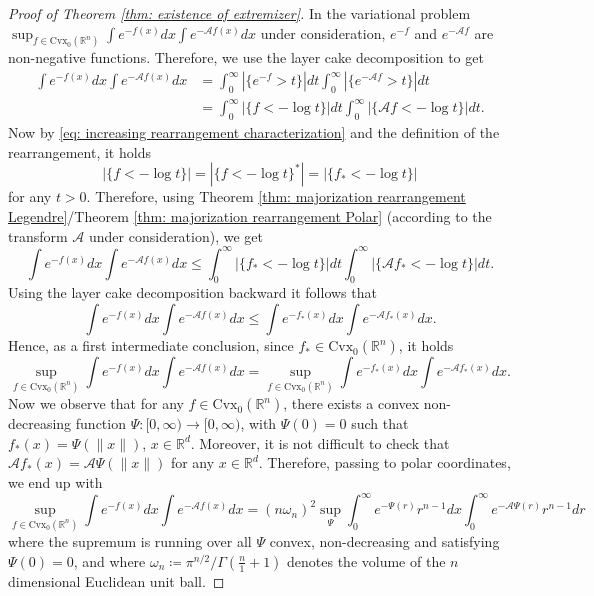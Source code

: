 \documentclass[11pt]{article}
\newcommand{\1}{[1]}
\begin{document}
\begin{proof} [Proof of Theorem \ref{thm: existence of extremizer}]
In the variational problem $\sup_{f\in\mathrm{Cvx}_0(\mathbb{R}^{n})}\int e^{-f(x)}dx\int e^{-\mathcal{A}f(x)}dx$ under consideration, $e^{-f}$ and $e^{-\mathcal{A}f}$ are non-negative functions. Therefore, we use the layer cake decomposition to get
\begin{align*}
\int e^{-f(x)}dx\int e^{-\mathcal{A}f(x)}dx
& =
\int_0^\infty |\{e^{-f} > t\}|dt \int_0^\infty |\{e^{-\mathcal{A}f} > t\}|dt \\
& =
\int_0^\infty |\{f < -\log t\}|dt \int_0^\infty |\{\mathcal{A}f < -\log t\}|dt .
\end{align*}
Now by \eqref{eq: increasing rearrangement characterization} and the definition of the rearrangement, it holds
$$
|\{f < -\log t\}|=|\{f < -\log t\}^*|=|\{f_* < -\log t\}|
$$ 
for any $t>0$. Therefore, using Theorem \ref{thm: majorization rearrangement Legendre}/Theorem \ref{thm: majorization rearrangement Polar} (according to the transform $\mathcal{A}$ under consideration), we get
$$
\int e^{-f(x)}dx\int e^{-\mathcal{A}f(x)}dx
\leq 
\int_0^\infty |\{f_* < -\log t\}|dt \int_0^\infty |\{\mathcal{A}f_* < -\log t\}|dt .
$$
Using the layer cake decomposition backward it follows that
$$
\int e^{-f(x)}dx\int e^{-\mathcal{A}f(x)}dx
\leq 
\int e^{-f_*(x)}dx\int e^{-\mathcal{A}f_*(x)}dx .
$$
Hence, as a first intermediate conclusion, since $f_* \in \mathrm{Cvx}_0(\mathbb{R}^{n})$,
it holds
$$
\sup_{f \in \mathrm{Cvx}_0(\mathbb{R}^{n})} \int e^{-f(x)}dx\int e^{-\mathcal{A}f(x)}dx
=
\sup_{f \in \mathrm{Cvx}_0(\mathbb{R}^{n})} \int e^{-f_*(x)}dx\int e^{-\mathcal{A}f_*(x)}dx .
$$
Now we observe that for any $f \in \mathrm{Cvx}_0(\mathbb{R}^{n})$, there exists a convex non-decreasing function $\Psi \colon [0,\infty) \to [0,\infty)$, with $\Psi(0)=0$ such that $f_*(x)=\Psi(\|x\|)$, $x \in \mathbb{R}^d$. Moreover, it is not difficult to check that 
$\mathcal{A}f_*(x)=\mathcal{A}\Psi(\|x\|)$ for any $x \in \mathbb{R}^d$. Therefore, passing to polar coordinates, we end up with
$$
\sup_{f \in \mathrm{Cvx}_0(\mathbb{R}^{n})} \int e^{-f(x)}dx\int e^{-\mathcal{A}f(x)}dx
= (n\omega_n)^2
\sup_{\Psi} \int_0^\infty e^{-\Psi(r)}r^{n-1}dx
\int_0^\infty e^{-\mathcal{A}\Psi(r)}r^{n-1}dr 
$$
where the supremum is running over all $\Psi$ convex, non-decreasing and satisfying $\Psi(0)=0$, and where $\omega_n\coloneqq\pi^{n/2}/\Gamma(\frac{n}{1}+1)$ denotes the volume of the $n$ dimensional Euclidean unit ball. 


\end{proof}
\end{document}
